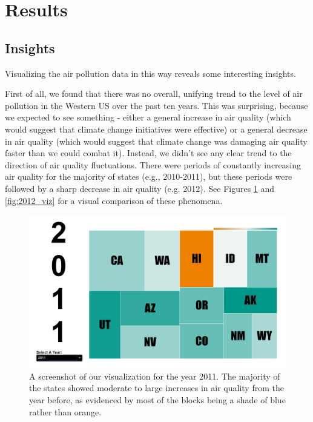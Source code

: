\documentclass[journal]{vgtc}                %
\begin{document}
\section{Results}

\subsection{Insights}

Visualizing the air pollution data in this way reveals some interesting insights.

First of all, we found that there was no overall, unifying trend to the level of air pollution in the Western US
over the past ten years. This was surprising, because we expected to see something - either a general increase in air quality
(which would suggest that climate change initiatives were effective) or a general decrease in air quality (which
would suggest that climate change was damaging air quality faster than we could combat it). Instead, we didn't see any clear 
trend to the direction of air quality fluctuations. There were periods of constantly increasing air quality for the majority 
of states (e.g., 2010-2011), but these periods were followed by a sharp decrease in air quality (e.g. 2012). See Figures \ref{fig:2011_viz}
and \ref{fig:2012_viz} for a visual comparison of these phenomena.

\begin{figure}
   \includegraphics[width=\columnwidth]{2011_viz.png}
   \caption{A screenshot of our visualization for the year 2011. The majority of the states showed moderate to large increases
   in air quality from the year before, as evidenced by most of the blocks being a shade of blue rather than orange. \label{fig:2011_viz}}
\end{figure}
\end{document}
